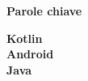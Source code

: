 
\newcommand{\clearemptydoublepage}{\newpage{\pagestyle{empty}%
    \cleardoublepage}}
\clearemptydoublepage
\thispagestyle{empty}
\vspace*{20ex}
\begin{flushright}
    \begin{LARGE}
        \textbf{Parole chiave}\\
        \vspace{5ex}
    \end{LARGE}
    \begin{normalsize}
        \textbf{%
            Kotlin\\%
            \medskip
            Android\\%
            \medskip
            Java
            \medskip
        }
    \end{normalsize}
\end{flushright}
\vfill
\clearemptydoublepage
